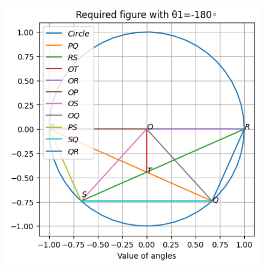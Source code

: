 \documentclass[12pt]{article}
\begin{document}
 

\begin{figure}[H]                            
\centering
\includegraphics[width=\columnwidth]{fig/9.10.4.3.png}                            
\caption{}                              
\label{fig:9.10.4.3}
\end{figure}
\end{document}
